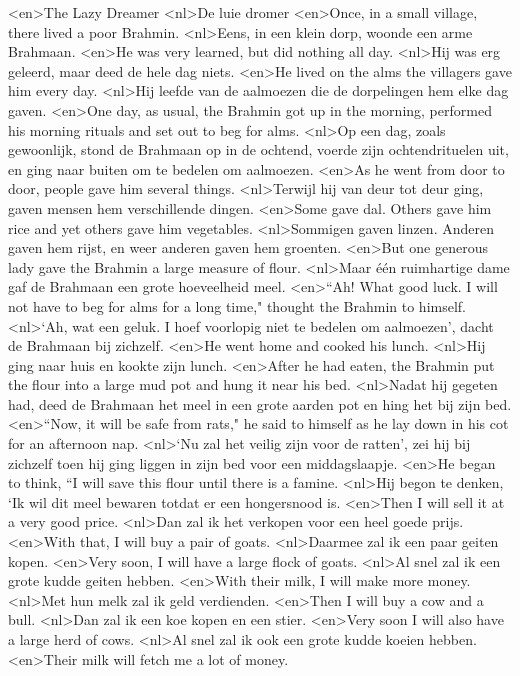 <en>The Lazy Dreamer
<nl>De luie dromer
<en>Once, in a small village, there lived a poor Brahmin. 
<nl>Eens, in een klein dorp, woonde een arme Brahmaan.
<en>He was very learned, but did nothing all day. 
<nl>Hij was erg geleerd, maar deed de hele dag niets.
<en>He lived on the alms the villagers gave him every day. 
<nl>Hij leefde van de aalmoezen die de dorpelingen hem elke dag gaven.
<en>One day, as usual, the Brahmin got up in the morning, performed his morning rituals and set out to beg for alms. 
<nl>Op een dag, zoals gewoonlijk, stond de Brahmaan op in de ochtend, voerde zijn ochtendrituelen uit, en ging naar buiten om te bedelen om aalmoezen.
<en>As he went from door to door, people gave him several things. 
<nl>Terwijl hij van deur tot deur ging, gaven mensen hem verschillende dingen. 
<en>Some gave dal. Others gave him rice and yet others gave him vegetables. 
<nl>Sommigen gaven linzen. Anderen gaven hem rijst, en weer anderen gaven hem groenten.
<en>But one generous lady gave the Brahmin a large measure of flour. 
<nl>Maar \'e\'en ruimhartige  dame gaf de Brahmaan een grote hoeveelheid meel.
<en>“Ah! What good luck. I will not have to beg for alms for a long time," thought the Brahmin to himself. 
<nl>`Ah, wat een geluk. I hoef voorlopig niet te bedelen om aalmoezen', dacht de Brahmaan bij zichzelf.
<en>He went home and cooked his lunch. 
<nl>Hij ging naar huis en kookte zijn lunch.
<en>After he had eaten, the Brahmin put the flour into a large mud pot and hung it near his bed. 
<nl>Nadat hij gegeten had, deed de Brahmaan het meel in een grote aarden pot en hing het bij zijn bed.
<en>“Now, it will be safe from rats," he said to himself as he lay down in his cot for an afternoon nap. 
<nl>`Nu zal het veilig zijn voor de ratten', zei hij bij zichzelf toen hij ging liggen in zijn bed voor een middagslaapje.
<en>He began to think, “I will save this flour until there is a famine. 
<nl>Hij begon te denken, `Ik wil dit meel bewaren totdat er een hongersnood is. 
<en>Then I will sell it at a very good price. 
<nl>Dan zal ik het verkopen voor een heel goede prijs.
<en>With that, I will buy a pair of goats. 
<nl>Daarmee zal ik een paar geiten kopen. 
<en>Very soon, I will have a large flock of goats. 
<nl>Al snel zal ik een grote kudde geiten hebben.
<en>With their milk, I will make more money. 
<nl>Met hun melk zal ik geld verdienden.
<en>Then I will buy a cow and a bull. 
<nl>Dan zal ik een koe kopen en een stier.
<en>Very soon I will also have a large herd of cows. 
<nl>Al snel zal ik ook een grote kudde koeien hebben.
<en>Their milk will fetch me a lot of money. 
